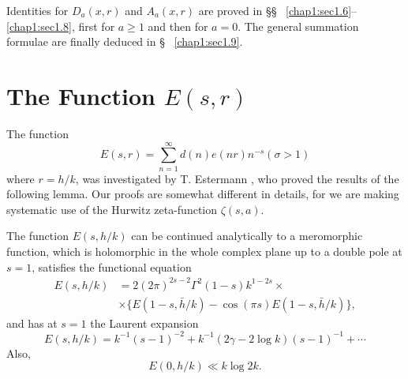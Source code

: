Identities for $D_a(x,r)$ and $A_a(x,r)$ are proved in \S\S~
\ref{chap1:sec1.6}--\ref{chap1:sec1.8}, first for $a\geq 1$ and then
for $a=0$. The general summation formulae are finally deduced in \S~
\ref{chap1:sec1.9}.

\section{The Function $E(s,r)$}\label{chap1:sec1.1}

The function 
\begin{equation}\label{chap1:eq1.1.1}
E(s,r)=\sum\limits_{n=1}^\infty d(n)e(nr)n^{-s}(\sigma > 1)
\end{equation}
where $r=h/k$, was investigated by T. Estermann \cite{key8}, who
proved the results of the following lemma. Our proofs are somewhat
different in details, for we are making systematic use of the Hurwitz
zeta-function $\zeta(s,a)$. 
\begin{lem}\label{chap1:lem1.1}
The function $E(s,h/k)$ can be continued analytically to a meromorphic
function, which is holomorphic in the whole complex plane up to a
double pole at $s=1$, satisfies the functional equation 
\begin{equation}
\begin{aligned}
E(s,h/k)& =2(2\pi)^{2s-2}\Gamma^2(1-s)k^{1-2s}\times\label{chap1:eq1.1.2}\\
& \times \{E(1-s,\bar{h}/k)-\cos(\pi s)E(1-s,\bar{h}/k)\},
\end{aligned}
\end{equation}\pageoriginale
and has at $s=1$ the Laurent expansion 
\begin{equation}\label{chap1:eq1.1.3}
E(s,h/k)=k^{-1}(s-1)^{-2}+k^{-1}(2\gamma -2\log k)(s-1)^{-1}+\cdots 
\end{equation}
Also,
\begin{equation}\label{chap1:eq1.1.4}
E(0,h/k)\ll k\log 2k.
\end{equation}
\end{lem}

